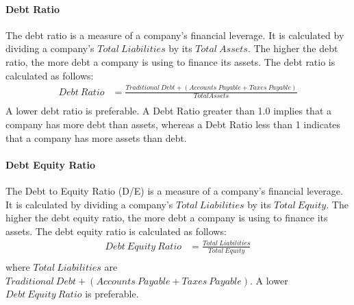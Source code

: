 \documentclass[../xlapes02]{subfiles}
\begin{document}
    \paragraph{Debt Ratio}\label{par:debt-ratio}
    The debt ratio is a measure of a company's financial leverage. It is calculated by dividing a company's $Total\ Liabilities$ by its $Total\ Assets$. The higher the debt ratio, the more debt a company is using to finance its assets. The debt ratio is calculated as follows:
    \begin{equation}
        \label{eq:debt-ratio}
        \begin{split}
            Debt\ Ratio&=\frac{Traditional\ Debt+(Accounts\ Payable+Taxes\ Payable)}{Total Assets}\\
        \end{split}
    \end{equation}
    A lower debt ratio is preferable. A Debt Ratio greater than 1.0 implies that a company has more debt than assets, whereas a Debt Ratio less than 1 indicates that a company has more assets than debt.

    \paragraph{Debt Equity Ratio}\label{par:debt-equity-ratio}
    The Debt to Equity Ratio (D/E) is a measure of a company's financial leverage. It is calculated by dividing a company's $Total\ Liabilities$ by its $Total\ Equity$. The higher the debt equity ratio, the more debt a company is using to finance its assets. The debt equity ratio is calculated as follows:
    \begin{equation}
        \label{eq:debt-equity-ratio}
        \begin{split}
            Debt\ Equity\ Ratio&=\frac{Total\ Liabilities}{Total\ Equity}\\
        \end{split}
    \end{equation}
    where $Total\ Liabilities$ are $Traditional\ Debt+(Accounts\ Payable+Taxes\ Payable)$. A lower $Debt\ Equity\ Ratio$ is preferable.
\end{document}
